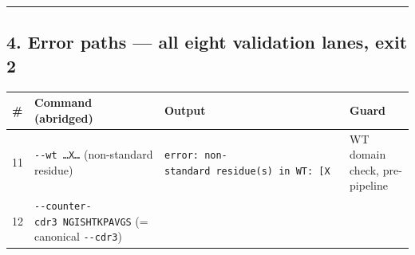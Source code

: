 \begin{center}\rule{0.5\linewidth}{0.5pt}\end{center}

\hypertarget{error-paths-all-eight-validation-lanes-exit-2}{%
\subsection{4. Error paths --- all eight validation lanes, exit
2}\label{error-paths-all-eight-validation-lanes-exit-2}}

\begin{longtable}[]{@{}llll@{}}
\toprule
\begin{minipage}[b]{0.22\columnwidth}\raggedright
\#\strut
\end{minipage} & \begin{minipage}[b]{0.22\columnwidth}\raggedright
Command (abridged)\strut
\end{minipage} & \begin{minipage}[b]{0.22\columnwidth}\raggedright
Output\strut
\end{minipage} & \begin{minipage}[b]{0.22\columnwidth}\raggedright
Guard\strut
\end{minipage}\tabularnewline
\midrule
\endhead
\begin{minipage}[t]{0.22\columnwidth}\raggedright
11\strut
\end{minipage} & \begin{minipage}[t]{0.22\columnwidth}\raggedright
\texttt{-\/-wt\ \ldots{}X\ldots{}} (non-standard residue)\strut
\end{minipage} & \begin{minipage}[t]{0.22\columnwidth}\raggedright
\texttt{error:\ non-standard\ residue(s)\ in\ WT:\ {[}\textquotesingle{}X\textquotesingle{}{]}}\strut
\end{minipage} & \begin{minipage}[t]{0.22\columnwidth}\raggedright
WT domain check, pre-pipeline\strut
\end{minipage}\tabularnewline
\begin{minipage}[t]{0.22\columnwidth}\raggedright
12\strut
\end{minipage} & \begin{minipage}[t]{0.22\columnwidth}\raggedright
\texttt{-\/-counter-cdr3\ NGISHTKPAVGS} (= canonical
\texttt{-\/-cdr3})\strut
\end{minipage} & \begin{minipage}[t]{0.22\columnwidth}\raggedright

\end{minipage}
\end{longtable}
